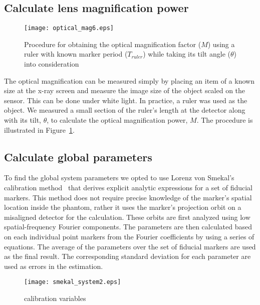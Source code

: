 \subsection{Calculate lens magnification power}
\begin{figure}[ht]
\centering
\texttt{[image: optical\_mag6.eps]}
\caption{Procedure for obtaining the optical magnification factor ($M$) using a ruler with known marker period ($T_{ruler}$) while taking its tilt angle ($\theta$) into consideration}
\label{fig:optical_mag}
\end{figure}
The optical magnification can be measured simply by placing an item of a known size at the x-ray screen and measure the image size of the object scaled on the sensor.  This can be done under white light.  In practice, a ruler was used as the object. We measured a small section of the ruler's length at the detector along with its tilt, $\theta$, to calculate the optical magnification power, $M$.  The procedure is illustrated in Figure~\ref{fig:optical_mag}.

\subsection{Calculate global parameters}

To find the global system parameters we opted to use Lorenz von Smekal's calibration method~\cite{Smekal2004} that derives explicit analytic expressions for a set of fiducial markers.  This method does not require precise knowledge of the marker's spatial location inside the phantom, rather it uses the marker's projection orbit on a misaligned detector for the calculation.  These orbits are first analyzed using low spatial-frequency Fourier components.  The parameters are then calculated based on each individual point markers from the Fourier coefficients by using a series of equations.  The average of the parameters over the set of fiducial markers are used as the final result.  The corresponding standard deviation for each parameter are used as errors in the estimation.

\begin{figure}[ht]
\texttt{[image: smekal\_system2.eps]}
\caption{calibration variables}
\label{fig:smekal_method}
\end{figure}

